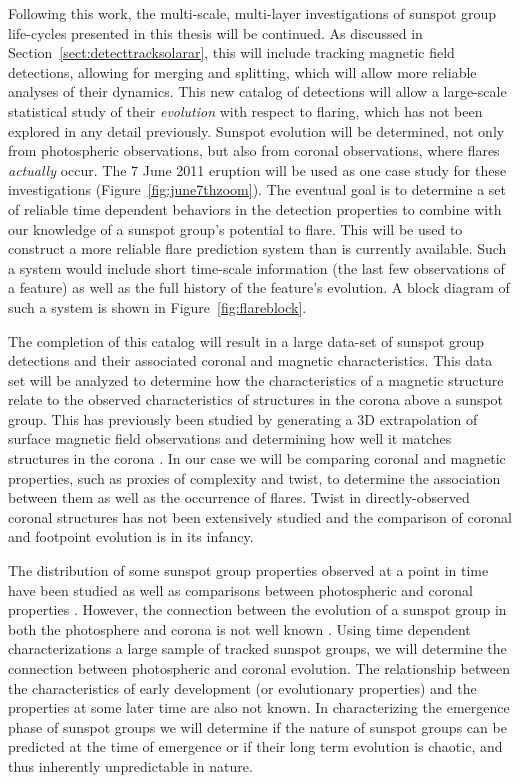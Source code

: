 Following this work, the multi-scale, multi-layer investigations of sunspot group life-cycles presented in this thesis will be continued. As discussed in Section~\ref{sect:detecttracksolarar}, this will include tracking magnetic field detections, allowing for merging and splitting, which will allow more reliable analyses of their dynamics. This new catalog of detections will allow a large-scale statistical study of their \emph{evolution} with respect to flaring, which has not been explored in any detail previously. Sunspot evolution will be determined, not only from photospheric observations, but also from coronal observations, where flares \emph{actually} occur. The 7 June 2011 eruption will be used as one case study for these investigations (Figure~\ref{fig:june7thzoom}). The eventual goal is to determine a set of reliable time dependent behaviors in the detection properties to combine with our knowledge of a sunspot group's potential to flare. This will be used to construct a more reliable flare prediction system than is currently available. Such a system would include short time-scale information (the last few observations of a feature) as well as the full history of the feature's evolution. A block diagram of such a system is shown in Figure~\ref{fig:flareblock}.

The completion of this catalog will result in a large data-set of sunspot group detections and their associated coronal and magnetic characteristics. This data set will be analyzed to determine how the characteristics of a magnetic structure relate to the observed characteristics of structures in the corona above a sunspot group. This has previously been studied by generating a 3D extrapolation of surface magnetic field observations and determining how well it matches structures in the corona \citep{Conlon:2010b}. In our case we will be comparing coronal and magnetic properties, such as proxies of complexity and twist, to determine the association between them as well as the occurrence of flares. Twist in directly-observed coronal structures has not been extensively studied and the comparison of coronal and footpoint evolution is in its infancy.

The distribution of some sunspot group properties observed at a point in time have been studied \citep{zhang:2010} as well as comparisons between photospheric and coronal properties \citep{Fisher:1998}. However, the connection between the evolution of a sunspot group in both the photosphere and corona is not well known \citep{Verbeeck:2011}. Using time dependent characterizations a large sample of tracked sunspot groups, we will determine the connection between photospheric and coronal evolution. The relationship between the characteristics of early development (or evolutionary properties) and the properties at some later time are also not known.  In characterizing the emergence phase of sunspot groups we will determine if the nature of sunspot groups can be predicted at the time of emergence or if their long term evolution is chaotic, and thus inherently unpredictable in nature. 

